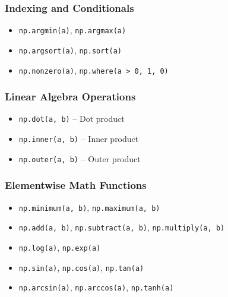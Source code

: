 \documentclass{article}
\begin{document}
\subsubsection*{Indexing and Conditionals}
\begin{itemize}
    \item \texttt{np.argmin(a)}, \texttt{np.argmax(a)}
    \item \texttt{np.argsort(a)}, \texttt{np.sort(a)}
    \item \texttt{np.nonzero(a)}, \texttt{np.where(a > 0, 1, 0)}
\end{itemize}

\subsubsection*{Linear Algebra Operations}
\begin{itemize}
    \item \texttt{np.dot(a, b)} -- Dot product
    \item \texttt{np.inner(a, b)} -- Inner product
    \item \texttt{np.outer(a, b)} -- Outer product
\end{itemize}

\subsubsection*{Elementwise Math Functions}
\begin{itemize}
    \item \texttt{np.minimum(a, b)}, \texttt{np.maximum(a, b)}
    \item \texttt{np.add(a, b)}, \texttt{np.subtract(a, b)}, \texttt{np.multiply(a, b)}
    \item \texttt{np.log(a)}, \texttt{np.exp(a)}
    \item \texttt{np.sin(a)}, \texttt{np.cos(a)}, \texttt{np.tan(a)}
    \item \texttt{np.arcsin(a)}, \texttt{np.arccos(a)}, \texttt{np.tanh(a)}
\end{itemize}
\end{document}
